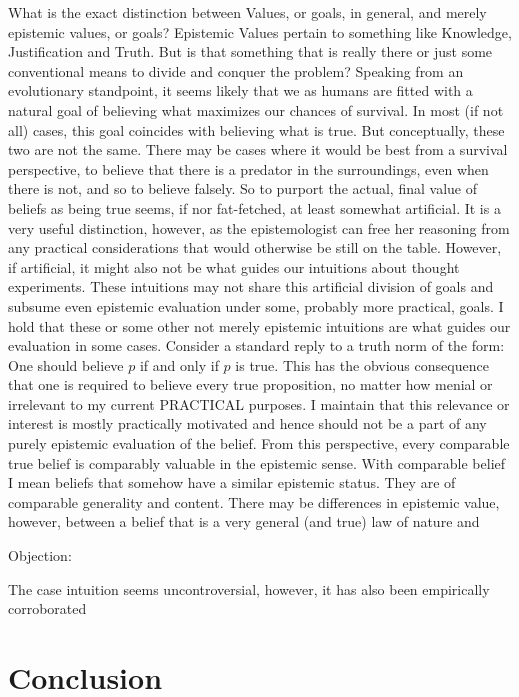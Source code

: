 \documentclass[12pt,numbers=noenddot]{scrartcl}
\begin{document}
What is the exact distinction between Values, or goals, in general, and merely epistemic values, or goals? Epistemic Values pertain to something like Knowledge, Justification and Truth. But is that something that is really there or just some conventional means to divide and conquer the problem? Speaking from an evolutionary standpoint, it seems likely that we as humans are fitted with a natural goal of believing what maximizes our chances of survival. In most (if not all) cases, this goal coincides with believing what is true. But conceptually, these two are not the same. There may be cases where it would be best from a survival perspective, to believe that there is a predator in the surroundings, even when there is not, and so to believe falsely. So to purport the actual, final value of beliefs as being true seems, if nor fat-fetched, at least somewhat artificial. It is a very useful distinction, however, as the epistemologist can free her reasoning from any practical considerations that would otherwise be still on the table. However, if artificial, it might also not be what guides our intuitions about thought experiments. These intuitions may not share this artificial division of goals and subsume even epistemic evaluation under some, probably more practical, goals. I hold that these or some other not merely epistemic intuitions are what guides our evaluation in some cases. Consider a standard reply to a truth norm of the form: One should believe $p$ if and only if $p$ is true. This has the obvious consequence that one is required to believe every true proposition, no matter how menial or irrelevant to my current PRACTICAL purposes. I maintain that this relevance or interest is mostly practically motivated and hence should not be a part of any purely epistemic evaluation of the belief. From this perspective, every comparable true belief is comparably valuable in the epistemic sense. With comparable belief I mean beliefs that somehow have a similar epistemic status. They are of comparable generality and content. There may be differences in epistemic value, however, between a belief that is a very general (and true) law of nature and

Objection: 

The case intuition seems uncontroversial, however, it has also been empirically corroborated \textcite{Andow2016}
\section{Conclusion}

\nocite{*}

\printbibliography
\end{document}
